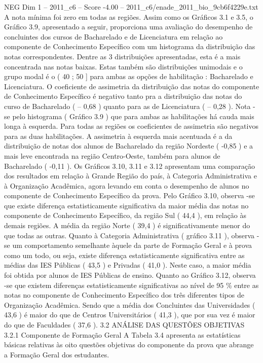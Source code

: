 \begin{textsample}{NEG Dim 1 – 2011\_c6 – Score -4.00 – 2011\_c6/enade\_2011\_bio\_9cb6f4229e.txt}
A nota mínima foi zero em todas as regiões.
Assim como os Gráficos 3.1 e 3.5, o Gráfico 3.9, apresentado a seguir, proporciona uma avaliação do desempenho de concluintes dos cursos de Bacharelado e de Licenciatura em relação ao componente de Conhecimento Específico com um histograma da distribuição das notas correspondentes.
Dentre as 3 distribuições apresentadas, esta é a mais concentrada nas notas baixas.
Estas também são distribuições unimodais e o grupo modal é o ( 40 ; 50 ] para ambas as opções de habilitação : Bacharelado e Licenciatura.
O coeficiente de assimetria da distribuição das notas do componente de Conhecimento Específico é negativo tanto pra a distribuição das notas do curso de Bacharelado ( – 0,68 ) quanto para as de Licenciatura ( – 0,28 ).
Nota -se pelo histograma ( Gráfico 3.9 ) que para ambas as habilitações há cauda mais longa à esquerda.
Para todas as regiões os coeficientes de assimetria são negativos para as duas habilitações.
A assimetria à esquerda mais acentuada é a da distribuição de notas dos alunos de Bacharelado da região Nordeste ( -0,85 ) e a mais leve encontrada na região Centro-Oeste, também para alunos de Bacharelado ( -0,11 ).
Os Gráficos 3.10, 3.11 e 3.12 apresentam uma comparação dos resultados em relação à Grande Região do país, à Categoria Administrativa e à Organização Acadêmica, agora levando em conta o desempenho de alunos no componente de Conhecimento Específico da prova.
Pelo Gráfico 3.10, observa -se que existe diferença estatisticamente significativa da maior média das notas no componente de Conhecimento Específico, da região Sul ( 44,4 ), em relação às demais regiões.
A média da região Norte ( 39,4 ) é significativamente menor do que todas as outras.
Quanto à Categoria Administrativa ( gráfico 3.11 ), observa -se um comportamento semelhante àquele da parte de Formação Geral e à prova como um todo, ou seja, existe diferença estatisticamente significativa entre as médias das IES Públicas ( 43,5 ) e Privadas ( 41,0 ).
Neste caso, a maior média foi obtida por alunos de IES Públicas de ensino.
Quanto ao Gráfico 3.12, observa -se que existem diferenças estatisticamente significativas ao nível de 95 \% entre as notas no componente de Conhecimento Específico dos três diferentes tipos de Organização Acadêmica.
Sendo que a média dos Concluintes das Universidades ( 43,6 ) é maior do que de Centros Universitários ( 41,3 ), que por sua vez é maior do que de Faculdades ( 37,6 ). 3.2 ANÁLISE DAS QUESTÕES OBJETIVAS 3.2.1 Componente de Formação Geral A Tabela 3.4 apresenta as estatísticas básicas relativas às oito questões objetivas do componente da prova que abrange a Formação Geral dos estudantes.

\end{textsample}
